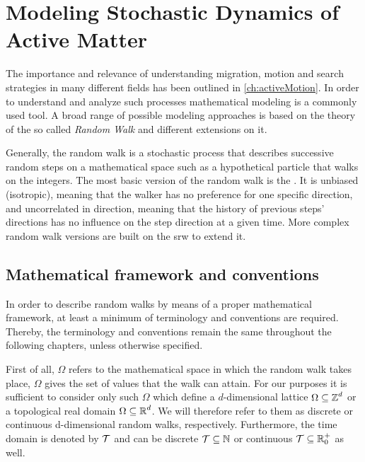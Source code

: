 \chapter{Modeling Stochastic Dynamics of Active Matter}\label{ch:modelingActiveMatter}
The importance and relevance of understanding migration, motion and search strategies in many different fields has been outlined in \autoref{ch:activeMotion}. In order to understand and analyze such processes mathematical modeling is a commonly used tool. A broad range of possible modeling approaches is based on the theory of the so called \textit{Random Walk} and different extensions on it.

Generally, the random walk is a stochastic process that describes successive random steps on a mathematical space such as a hypothetical particle that walks on the integers. The most basic version of the random walk is the . It is unbiased (isotropic), meaning that the walker has no preference for one specific direction, and uncorrelated in direction, meaning that the history of previous steps' directions has no influence on the step direction at a given time. More complex random walk versions are built on the \ac{srw} to extend it.

\section{Mathematical framework and conventions}

In order to describe random walks by means of a proper mathematical framework, at least a minimum of terminology and conventions are required. Thereby, the terminology and conventions remain the same throughout the following chapters, unless otherwise specified.

First of all, $\Omega$ refers to the mathematical space in which the random walk takes place, \ie $\Omega$ gives the set of values that the walk can attain. For our purposes it is sufficient to consider only such $\Omega$ which define a $d$-dimensional lattice $\Omega \subseteq \operatorname{\mathbb{Z}}^d$ or a topological real domain $\Omega \subseteq \operatorname{\mathbb{R}}^d$. We will therefore refer to them as discrete or continuous d-dimensional random walks, respectively. Furthermore, the time domain is denoted by $\mathcal{T}$ and can be discrete $\mathcal{T} \subseteq \operatorname{\mathbb{N}}$ or continuous $\mathcal{T} \subseteq \operatorname{\mathbb{R}}^+_0$ as well.

